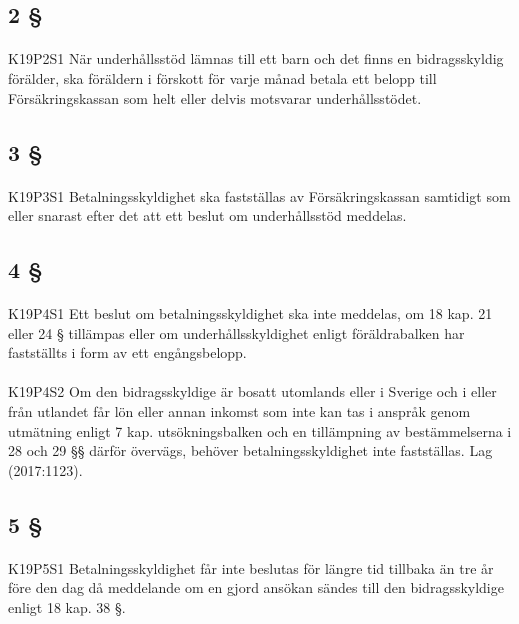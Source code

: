 \documentclass[a4paper,notitlepage,openany,10pt]{book}
\begin{document}
\subsection*{2 §}
\paragraph*{}
{\tiny K19P2S1}
När underhållsstöd lämnas till ett barn och det finns en bidragsskyldig förälder, ska föräldern i förskott för varje månad betala ett belopp till Försäkringskassan som helt eller delvis motsvarar underhållsstödet.
\subsection*{3 §}
\paragraph*{}
{\tiny K19P3S1}
Betalningsskyldighet ska fastställas av Försäkringskassan samtidigt som eller snarast efter det att ett beslut om underhållsstöd meddelas.
\subsection*{4 §}
\paragraph*{}
{\tiny K19P4S1}
Ett beslut om betalningsskyldighet ska inte meddelas, om 18 kap. 21 eller 24 § tillämpas eller om underhållsskyldighet enligt föräldrabalken har fastställts i form av ett engångsbelopp.
\paragraph*{}
{\tiny K19P4S2}
Om den bidragsskyldige är bosatt utomlands eller i Sverige och i eller från utlandet får lön eller annan inkomst som inte kan tas i anspråk genom utmätning enligt 7 kap. utsökningsbalken och en tillämpning av bestämmelserna i 28 och 29 §§ därför övervägs, behöver betalningsskyldighet inte fastställas.
Lag (2017:1123).
\subsection*{5 §}
\paragraph*{}
{\tiny K19P5S1}
Betalningsskyldighet får inte beslutas för längre tid tillbaka än tre år före den dag då meddelande om en gjord ansökan sändes till den bidragsskyldige enligt 18 kap. 38 §.
\end{document}
